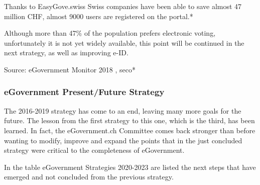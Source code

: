 Thanks to EasyGove.swiss Swiss companies have been able to save almost 47 million CHF, almost 9000 users are registered on the portal.*

Although more than 47\% of the population prefers electronic voting, unfortunately it is not yet widely available, this point will be continued in the next strategy, as well as improving e-ID.

Source: eGovernment Monitor 2018 \cite{eGov2018Monitor}, \acrshort{seco}*



\subsubsection{eGovernment Present/Future Strategy}
The 2016-2019 strategy has come to an end, leaving many more goals for the future. The lesson from the first strategy to this one, which is the third, has been learned. In fact, the eGovernment.ch Committee comes back stronger than before wanting to modify, improve and expand the points that in the just concluded strategy were critical to the completeness of eGovernment.

In the table eGovernment Strategies 2020-2023 are listed the next steps that have emerged and not concluded from the previous strategy.\\

